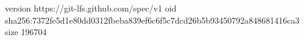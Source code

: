 version https://git-lfs.github.com/spec/v1
oid sha256:7372fe5d1e80dd0312fbeba839ef6c6f5c7dcd26b5b93450792a848681416ca3
size 196704
